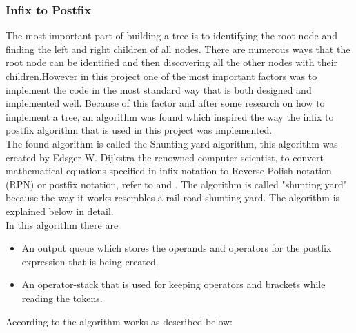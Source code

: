 \documentclass[10pt, a4paper, titlepage]{article}
\begin{document}
\subsubsection{Infix to Postfix}
The most important part of building a tree is to identifying the root node and finding the left and right children of all nodes. There are numerous ways that the root node can be identified and then discovering all the other nodes with their children.However in this project one of the most important factors was to implement the code in the most standard way that is both designed and implemented well. Because of this factor and after some research on how to implement a tree, an algorithm was found which inspired the way the infix to postfix algorithm that is used in this project was implemented.\\
The found algorithm is called the Shunting-yard algorithm, this algorithm was created by Edsger W. Dijkstra the renowned computer scientist, to convert mathematical equations specified in infix notation to Reverse Polish notation (RPN) or postfix notation, refer to \cite{edgar_paper} and \cite{shunting_site}. The algorithm is called "shunting yard" because the way it works resembles a rail road shunting yard. The algorithm is explained below in detail.\\
In this algorithm there are 

\begin{itemize}
\item An output queue which stores the operands and operators for the postfix expression that is being created.
\item An operator-stack that is used for keeping operators and brackets while reading the tokens. 
\end{itemize}

According to \cite{shunting_site} the algorithm works as described below:
\end{document}

